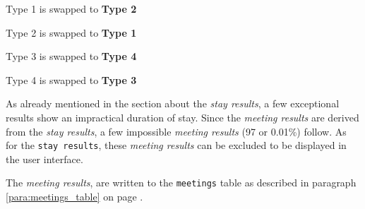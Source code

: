 \begin{mylist}
\item Type 1 is swapped to \textbf{Type 2}   
\item Type 2 is swapped to \textbf{Type 1}
\item Type 3 is swapped to \textbf{Type 4} 
\item Type 4 is swapped to \textbf{Type 3}
\end{mylist}

As already mentioned in the section about the \textit{stay results}, a few exceptional results show an impractical duration of stay. Since the \textit{meeting results} are derived from the \textit{stay results}, a few impossible \textit{meeting results} (97 or 0.01\%) follow. As for the \lstinline|stay results|, these \textit{meeting results} can be excluded to be displayed in the user interface.

The \textit{meeting results}, are written to the \lstinline|meetings| table as described in paragraph \ref{para:meetings_table} on page \pageref{para:meetings_table}. 

